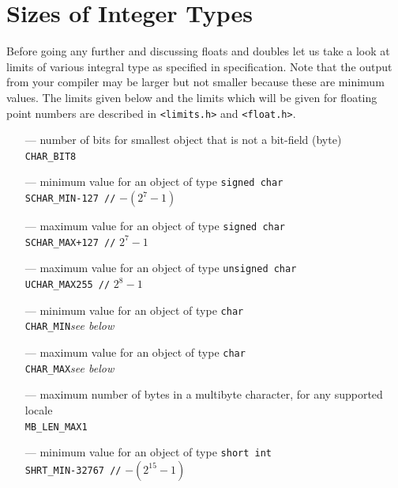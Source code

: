 \section{Sizes of Integer Types}
Before going any further and discussing floats and doubles let us take a look
at limits of various integral type as specified in specification. Note that the
output from your compiler may be larger but not smaller because these are
minimum values. The limits given below and the limits which will be given for
floating point numbers are described in \texttt{<limits.h>} and
\texttt{<float.h>}.

\begin{itemize}
\item[---] number of bits for smallest object that is not a bit-field (byte)\\
\texttt{CHAR\_BIT}\hfil\hspace*{2cm}\texttt{8}
\item[---] minimum value for an object of type \texttt{signed char}\\
\texttt{SCHAR\_MIN}\hfil\hspace*{2cm}\texttt{-127 //} $-(2^7 - 1)$
\item[---] maximum value for an object of type \texttt{signed char}\\
\texttt{SCHAR\_MAX}\hfil\hspace*{2cm}\texttt{+127 //} $2^7 - 1$
\item[---] maximum value for an object of type \texttt{unsigned char}\\
\texttt{UCHAR\_MAX}\hfil\hspace*{2cm}\texttt{255 //} $2^8 - 1$
\item[---] minimum value for an object of type \texttt{char}\\
\texttt{CHAR\_MIN}\hfil\hspace*{2cm}\textit{see below}
\item[---] maximum value for an object of type \texttt{char}\\
\texttt{CHAR\_MAX}\hfil\hspace*{2cm}\textit{see below}
\item[---] maximum number of bytes in a multibyte character, for any supported
  locale\\
\texttt{MB\_LEN\_MAX}\hfil\hspace*{2cm}\texttt{1}
\item[---] minimum value for an object of type \texttt{short int}\\
\texttt{SHRT\_MIN}\hfil\hspace*{2cm}\texttt{-32767 //} $-(2^{15} - 1)$

\end{itemize}
